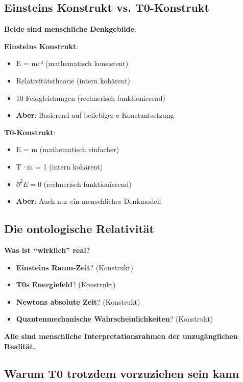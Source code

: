 	\subsection{Einsteins Konstrukt vs. T0-Konstrukt}
	
	\textbf{Beide sind menschliche Denkgebilde}:
	
	\textbf{Einsteins Konstrukt}:
	\begin{itemize}
		\item E = mc² (mathematisch konsistent)
		\item Relativitätstheorie (intern kohärent)
		\item 10 Feldgleichungen (rechnerisch funktionierend)
		\item \textbf{Aber}: Basierend auf beliebiger c-Konstantsetzung
	\end{itemize}
	
	\textbf{T0-Konstrukt}:
	\begin{itemize}
		\item E = m (mathematisch einfacher)
		\item T·m = 1 (intern kohärent)
		\item $\partial^2 E = 0$ (rechnerisch funktionierend)
		\item \textbf{Aber}: Auch nur ein menschliches Denkmodell
	\end{itemize}
	
	\subsection{Die ontologische Relativität}
	
	\textbf{Was ist ``wirklich'' real?}
	\begin{itemize}
		\item \textbf{Einsteins Raum-Zeit}? (Konstrukt)
		\item \textbf{T0s Energiefeld}? (Konstrukt)
		\item \textbf{Newtons absolute Zeit}? (Konstrukt)
		\item \textbf{Quantenmechanische Wahrscheinlichkeiten}? (Konstrukt)
	\end{itemize}
	
	\textbf{Alle sind menschliche Interpretationsrahmen der unzugänglichen Realität.}
	
	\subsection{Warum T0 trotzdem vorzuziehen sein kann}
	
